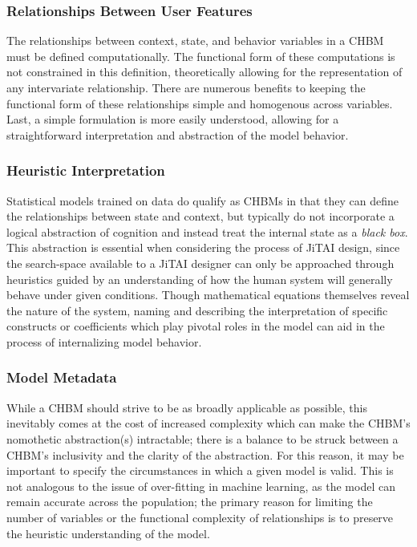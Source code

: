\documentclass[runningheads,a4paper]{llncs}
\begin{document}
\subsubsection{Relationships Between User Features}
The relationships between context, state, and behavior variables in a CHBM must be defined computationally.
The functional form of these computations is not constrained in this definition, theoretically allowing for the representation of any intervariate relationship.
There are numerous benefits to keeping the functional form of these relationships simple and homogenous across variables.
Last, a simple formulation is more easily understood, allowing for a straightforward interpretation and abstraction of the model behavior.

\subsubsection{Heuristic Interpretation}
Statistical models trained on data do qualify as CHBMs in that they can define the relationships between state and context, but typically do not incorporate a logical abstraction of cognition and instead treat the internal state as a \emph{black box}.
This abstraction is essential when considering the process of JiTAI design, since the search-space available to a JiTAI designer can only be approached through heuristics guided by an understanding of how the human system will generally behave under given conditions.
Though mathematical equations themselves reveal the nature of the system, naming and describing the interpretation of specific constructs or coefficients which play pivotal roles in the model can aid in the process of internalizing model behavior.

\subsubsection{Model Metadata}
While a CHBM should strive to be as broadly applicable as possible, this inevitably comes at the cost of increased complexity which can make the CHBM's nomothetic abstraction(s) intractable; there is a balance to be struck between a CHBM's inclusivity and the clarity of the abstraction.
For this reason, it may be important to specify the circumstances in which a given model is valid.
This is not analogous to the issue of over-fitting in machine learning, as the model can remain accurate across the population; the primary reason for limiting the number of variables or the functional complexity of relationships is to preserve the heuristic understanding of the model.
\end{document}
